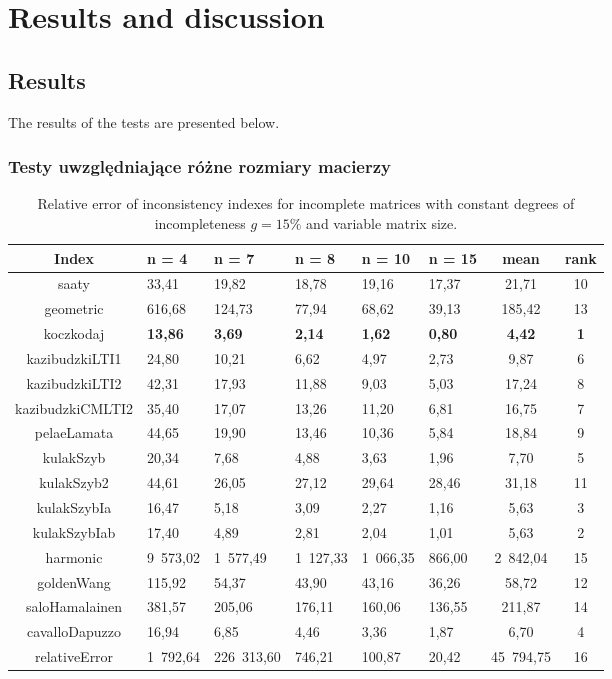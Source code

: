 \chapter{Results and discussion}
\label{sec:results}
\section{Results}
The results of the tests are presented below.

\subsection{Testy uwzględniające różne rozmiary macierzy}
\begin{table}[ht]
\begin{center}
\caption{Relative error of inconsistency indexes for incomplete matrices with constant degrees of incompleteness $g=15\%$ and variable matrix size.}
\label{tab:results1}
\begin{tabular}{|c||l|l|l|l|l|c||c|}
\hline Index & n = 4 & n = 7 & n = 8 & n = 10 & n = 15 & mean & rank \\ \hline \hline
saaty & 33,41 & 19,82 & 18,78 & 19,16 & 17,37 & 21,71 & 10 \\ \hline
geometric & 616,68 & 124,73 & 77,94 & 68,62 & 39,13 & 185,42 & 13 \\ \hline
koczkodaj & \textbf{13,86} & \textbf{3,69} & \textbf{2,14} & \textbf{1,62} & \textbf{0,80} & \textbf{4,42} & \textbf{1} \\ \hline
kazibudzkiLTI1 & 24,80 & 10,21 & 6,62 & 4,97 & 2,73 & 9,87 & 6 \\ \hline
kazibudzkiLTI2 & 42,31 & 17,93 & 11,88 & 9,03 & 5,03 & 17,24 & 8 \\ \hline
kazibudzkiCMLTI2 & 35,40 & 17,07 & 13,26 & 11,20 & 6,81 & 16,75 & 7 \\ \hline
pelaeLamata & 44,65 & 19,90 & 13,46 & 10,36 & 5,84 & 18,84 & 9 \\ \hline
kulakSzyb & 20,34 & 7,68 & 4,88 & 3,63 & 1,96 & 7,70 & 5 \\ \hline
kulakSzyb2 & 44,61 & 26,05 & 27,12 & 29,64 & 28,46 & 31,18 & 11 \\ \hline
kulakSzybIa & 16,47 & 5,18 & 3,09 & 2,27 & 1,16 & 5,63 & 3 \\ \hline
kulakSzybIab & 17,40 & 4,89 & 2,81 & 2,04 & 1,01 & 5,63 & 2 \\ \hline
harmonic & 9 573,02 & 1 577,49 & 1 127,33 & 1 066,35 & 866,00 & 2 842,04 & 15 \\ \hline
goldenWang & 115,92 & 54,37 & 43,90 & 43,16 & 36,26 & 58,72 & 12 \\ \hline
saloHamalainen & 381,57 & 205,06 & 176,11 & 160,06 & 136,55 & 211,87 & 14 \\ \hline
cavalloDapuzzo & 16,94 & 6,85 & 4,46 & 3,36 & 1,87 & 6,70 & 4 \\ \hline
relativeError & 1 792,64 & 226 313,60 & 746,21 & 100,87 & 20,42 & 45 794,75 & 16 \\ \hline
\end{tabular}
\end{center}
\end{table}

